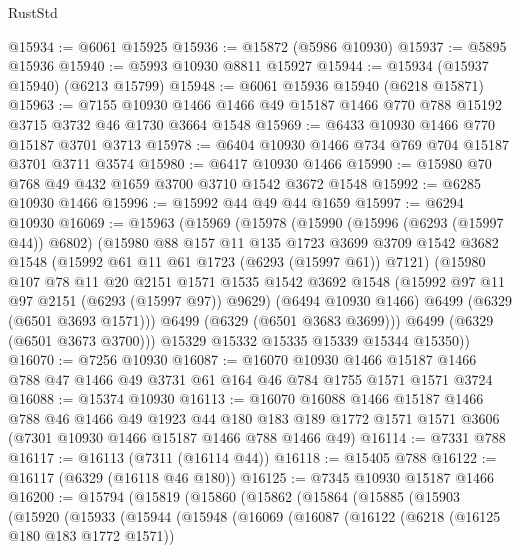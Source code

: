\begin{lexlean}{RustStd}
\begin{coremodule}
{{@15934 := @6061 @15925
@15936 := @15872 (@5986 @10930)
@15937 := @5895 @15936
@15940 := @5993 @10930 @8811 @15927
@15944 := @15934 (@15937 @15940) (@6213 @15799)
@15948 := @6061 @15936 @15940 (@6218 @15871)
@15963 := @7155
    @10930
    @1466
    @1466
    @49
    @15187
    @1466
    @770
    @788
    @15192
    @3715
    @3732
    @46
    @1730
    @3664
    @1548
@15969 := @6433 @10930 @1466 @770 @15187 @3701 @3713
@15978 := @6404 @10930 @1466 @734 @769 @704 @15187 @3701 @3711 @3574
@15980 := @6417 @10930 @1466
@15990 := @15980 @70 @768 @49 @432 @1659 @3700 @3710 @1542 @3672 @1548
@15992 := @6285 @10930 @1466
@15996 := @15992 @44 @49 @44 @1659
@15997 := @6294 @10930
@16069 := @15963
    (@15969
      (@15978
        (@15990
          (@15996 (@6293 (@15997 @44)) @6802)
          (@15980
            @88
            @157
            @11
            @135
            @1723
            @3699
            @3709
            @1542
            @3682
            @1548
            (@15992 @61 @11 @61 @1723 (@6293 (@15997 @61)) @7121)
            (@15980
              @107
              @78
              @11
              @20
              @2151
              @1571
              @1535
              @1542
              @3692
              @1548
              (@15992 @97 @11 @97 @2151 (@6293 (@15997 @97)) @9629)
              (@6494 @10930 @1466)
              @6499
              (@6329 (@6501 @3693 @1571)))
            @6499
            (@6329 (@6501 @3683 @3699)))
          @6499
          (@6329 (@6501 @3673 @3700)))
        @15329
        @15332
        @15335
        @15339
        @15344
        @15350))
@16070 := @7256 @10930
@16087 := @16070
    @10930
    @1466
    @15187
    @1466
    @788
    @47
    @1466
    @49
    @3731
    @61
    @164
    @46
    @784
    @1755
    @1571
    @1571
    @3724
@16088 := @15374 @10930
@16113 := @16070
    @16088
    @1466
    @15187
    @1466
    @788
    @46
    @1466
    @49
    @1923
    @44
    @180
    @183
    @189
    @1772
    @1571
    @1571
    @3606
    (@7301 @10930 @1466 @15187 @1466 @788 @1466 @49)
@16114 := @7331 @788
@16117 := @16113 (@7311 (@16114 @44))
@16118 := @15405 @788
@16122 := @16117 (@6329 (@16118 @46 @180))
@16125 := @7345 @10930 @15187 @1466
@16200 := @15794
    (@15819
      (@15860
        (@15862
          (@15864
            (@15885
              (@15903
                (@15920
                  (@15933
                    (@15944
                      (@15948
                        (@16069
                          (@16087
                            (@16122
                              (@6218 (@16125 @180 @183 @1772 @1571))
}}
\end{coremodule}
\end{lexlean}
